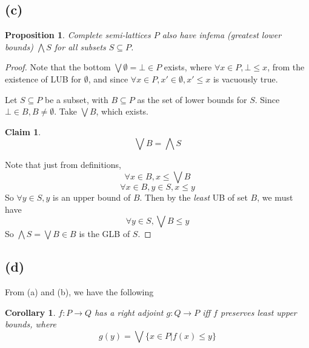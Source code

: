 \documentclass[11pt]{article} %
\newtheorem{corollary}[theorem]{Corollary}
\newtheorem{proposition}[theorem]{Proposition}
\newtheorem{claim}[theorem]{Claim}
\theoremstyle{definition}
\theoremstyle{definition}
\theoremstyle{definition}
\begin{document}
\subsection{(c)}
\begin{proposition}
  Complete semi-lattices $P$ also have infema (greatest lower bounds) $\bigwedge S$ for all subsets $S\subseteq P$.
\end{proposition}
\begin{proof}
  Note that the bottom $\bigvee \emptyset = \bot\in P$ exists, where $\forall x\in P, \bot \leq x$,
  from the existence of LUB for $\emptyset$, 
  and since $\forall x\in P, x'\in \emptyset, x' \leq x$ is vacuously true.

  Let $S\subseteq P$ be a subset, with $B\subseteq P$ as the set of lower bounds for $S$.
  Since $\bot\in B, B\neq \emptyset$.
  Take $\bigvee B$, which exists.

\begin{claim}
  \[\bigvee B = \bigwedge S\]
\end{claim}
Note that just from definitions,
\[\forall x\in B, x\leq \bigvee B\]
\[\forall x\in B, y\in S, x\leq y\]
So $\forall y\in S,y$ is an upper bound of $B$. 
Then by the \textit{least} UB of set $B$, we must have
\[\forall y\in S, \bigvee B \leq y\]
So $\bigwedge S = \bigvee B \in B$ is the GLB of $S$.

\end{proof}

\subsection{(d)}
From  (a) and (b), we have the following
\begin{corollary}
  $f:P\rightarrow Q$ has a right adjoint $g: Q\rightarrow P$ iff $f$ preserves least upper bounds, where
  \[g(y) = \bigvee \{x\in P | f(x) \leq y\}\]
\end{corollary}
\end{document}
